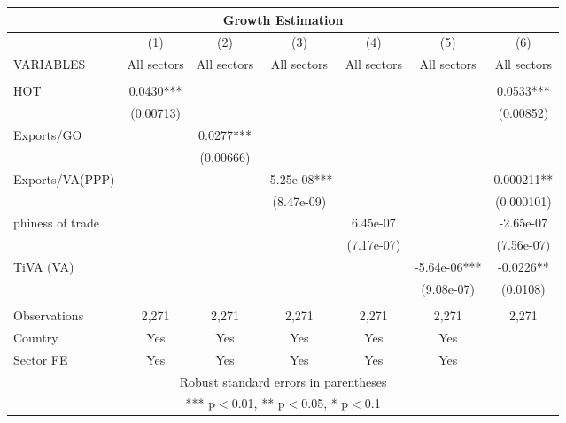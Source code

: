 \documentclass[]{article}
\begin{document}
\begin{tabular}{lcccccc}
\multicolumn{7}{c}{Growth Estimation} \\ \hline
 & (1) & (2) & (3) & (4) & (5) & (6) \\
VARIABLES & All sectors & All sectors & All sectors & All sectors & All sectors & All sectors \\ \hline
 &  &  &  &  &  &  \\
HOT & 0.0430*** &  &  &  &  & 0.0533*** \\
 & (0.00713) &  &  &  &  & (0.00852) \\
Exports/GO &  & 0.0277*** &  &  &  &  \\
 &  & (0.00666) &  &  &  &  \\
Exports/VA(PPP) &  &  & -5.25e-08*** &  &  & 0.000211** \\
 &  &  & (8.47e-09) &  &  & (0.000101) \\
phiness of trade &  &  &  & 6.45e-07 &  & -2.65e-07 \\
 &  &  &  & (7.17e-07) &  & (7.56e-07) \\
TiVA (VA) &  &  &  &  & -5.64e-06*** & -0.0226** \\
 &  &  &  &  & (9.08e-07) & (0.0108) \\
 &  &  &  &  &  &  \\
Observations & 2,271 & 2,271 & 2,271 & 2,271 & 2,271 & 2,271 \\
Country & Yes & Yes & Yes & Yes & Yes &  \\
 Sector FE & Yes & Yes & Yes & Yes & Yes &  \\ \hline
\multicolumn{7}{c}{ Robust standard errors in parentheses} \\
\multicolumn{7}{c}{ *** p$<$0.01, ** p$<$0.05, * p$<$0.1} \\
\end{tabular}
\end{document}
